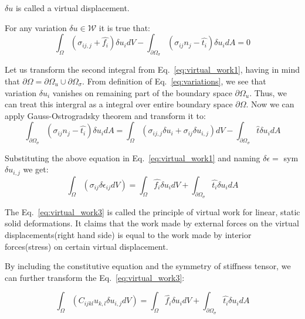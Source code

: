 \documentclass[en]{minipw} %
\begin{document}
$\delta u$ is called a virtual displacement. 

For any variation $\delta u \in \mathcal{W}$ it is true that:
\begin{equation}
\label{eq:virtual_work1}
\int_{\Omega}(\sigma_{ij,j} + \hat{f_i}) \delta u_{i} dV - \int_{\partial \Omega_{\sigma}}(\sigma_{ij}n_{j} - \hat{t_{i}}) \delta u_{i}dA = 0
\end{equation}

Let us transform the second integral from Eq.~\ref{eq:virtual_work1}, having in mind that $\partial \Omega = \partial \Omega_{u} \cup \partial \Omega_{\sigma}$. From definition of Eq.~\ref{eq:variations}, we see that variation $\delta u_{i}$ vanishes on remaining part of the boundary space $\partial \Omega_{u}$. Thus, we can treat this intergral as a integral over entire boundary space $\partial \Omega$. Now we can apply Gauss-Ostrogradsky theorem and transform it to:
\begin{equation}
\label{eq:virtual_work2}
\int_{\partial \Omega_{\sigma}}(\sigma_{ij}n_{j} - \hat{t_{i}}) \delta u_{i}dA = \int_{\Omega}(\sigma_{ij,j} \delta u_{i} + \sigma_{ij} \delta u_{i,j}) dV - \int_{\partial \Omega_{\sigma}} \hat{t} \delta u_i dA
\end{equation}

Substituting the above equation in Eq.~\ref{eq:virtual_work1} and naming $\delta \epsilon =$ sym $\delta u_{i,j}$ we get:
\begin{equation}
\label{eq:virtual_work3}
\int_{\Omega}(\sigma_{ij} \delta \epsilon_{ij} dV ) = \int_{\Omega} \hat{f_i} \delta u_{i} dV + \int_{\partial \Omega_{\sigma}} \hat{t_i} \delta u_{i} dA
\end{equation}

The Eq.~\ref{eq:virtual_work3} is called the principle of virtual work for linear, static solid deformations. It claims that the work made by external forces on the virtual displacements(right hand side) is equal to the work made by interior forces(stress) on certain virtual displacement.

By including the constitutive equation and the symmetry of stiffness tensor, we can further transform the Eq.~\ref{eq:virtual_work3}:

\begin{equation}
\label{eq:virtual_work4}
\int_{\Omega}(C_{ijkl} u_{k,l} \delta u_{i,j} dV ) = \int_{\Omega} \hat{f_i} \delta u_{i} dV + \int_{\partial \Omega_{\sigma}} \hat{t_i} \delta u_{i} dA
\end{equation}
\end{document}
